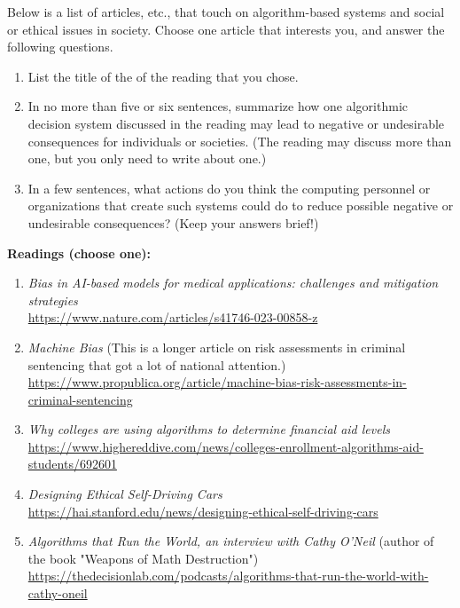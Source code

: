 \documentclass[10pt]{article}
\begin{document}
Below is a list of articles, etc., that touch on algorithm-based systems and social or ethical issues in society. 
Choose one article that interests you, and answer the following questions.
\begin{enumerate}
\item List the title of the of the reading that you chose.

\soln

\item In no more than five or six sentences, summarize how one algorithmic decision system discussed in the reading may lead to negative or undesirable consequences for individuals or societies. (The reading may discuss more than one, but you only need to write about one.)

\soln

\item In a few sentences, what actions do you think the computing personnel or organizations that create such systems could do to reduce possible negative or undesirable consequences?  (Keep your answers brief!)

\soln

\end{enumerate}

\vspace*{.35in}
\textbf{Readings (choose one):}
\begin{enumerate}

\item \textit{Bias in AI-based models for medical applications: challenges and mitigation strategies}
\\ \url{https://www.nature.com/articles/s41746-023-00858-z}

\item \textit{Machine Bias} (This is a longer article on risk assessments in criminal sentencing that got a lot of national attention.)
\\ \small{\url{https://www.propublica.org/article/machine-bias-risk-assessments-in-criminal-sentencing}}

\item \textit{Why colleges are using algorithms to determine financial aid levels}
\\ \small{\url{https://www.highereddive.com/news/colleges-enrollment-algorithms-aid-students/692601}}

\item \textit{Designing Ethical Self-Driving Cars}
\\ \url{https://hai.stanford.edu/news/designing-ethical-self-driving-cars}

\item \textit{Algorithms that Run the World, an interview with Cathy O’Neil} (author of the book "Weapons of Math Destruction")
\\ \small{\url{https://thedecisionlab.com/podcasts/algorithms-that-run-the-world-with-cathy-oneil}}

\end{enumerate}
\end{document}
